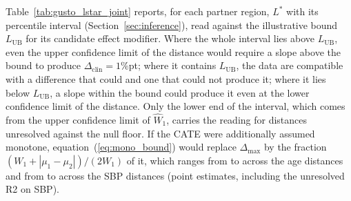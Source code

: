\documentclass[AMA,Times1COL]{WileyNJDv5}
\begin{document}
Table~\ref{tab:gusto_lstar_joint} reports, for each partner region, $L^*$ with its percentile interval (Section~\ref{sec:inference}), read against the illustrative bound $L_{\text{UB}}$ for its candidate effect modifier. Where the whole interval lies above $L_{\text{UB}}$, even the upper confidence limit of the distance would require a slope above the bound to produce $\Delta_{\text{clin}} = 1$\%pt; where it contains $L_{\text{UB}}$, the data are compatible with a difference that could and one that could not produce it; where it lies below $L_{\text{UB}}$, a slope within the bound could produce it even at the lower confidence limit of the distance. Only the lower end of the interval, which comes from the upper confidence limit of $\widehat{W}_1$, carries the reading for distances unresolved against the null floor. If the CATE were additionally assumed monotone, equation~(\ref{eq:mono_bound}) would replace $\Delta_{\max}$ by the fraction $(W_1 + |\mu_1 - \mu_2|)/(2 W_1)$ of it, which ranges from  to  across the age distances and from  to  across the SBP distances (point estimates, including the unresolved R2 on SBP).
\end{document}
